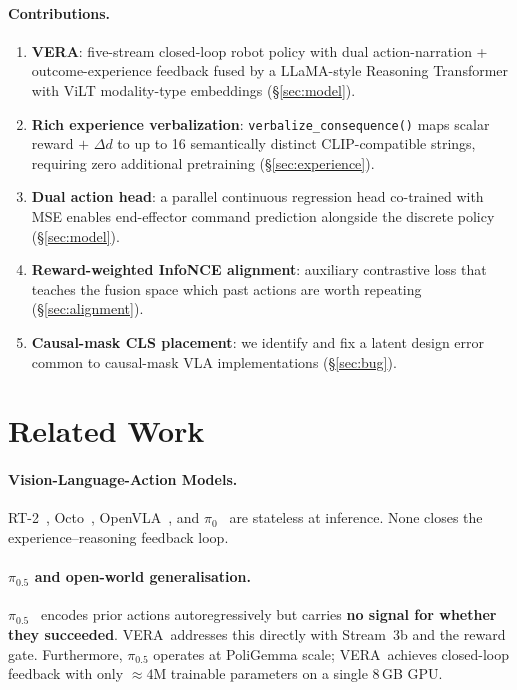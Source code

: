 \documentclass{article}
\newcommand{\modelname}{\textsc{VERA}\xspace}
\begin{document}
\paragraph{Contributions.}
\begin{enumerate}[leftmargin=1.5em,itemsep=2pt]
\item \textbf{\modelname}: five-stream closed-loop robot policy with dual
  action-narration + outcome-experience feedback fused by a LLaMA-style
  Reasoning Transformer with ViLT modality-type embeddings (\S\ref{sec:model}).
\item \textbf{Rich experience verbalization}: \texttt{verbalize\_consequence()}
  maps scalar reward $+$ $\Delta d$ to up to 16 semantically distinct
  CLIP-compatible strings, requiring zero additional pretraining (\S\ref{sec:experience}).
\item \textbf{Dual action head}: a parallel continuous regression head
  co-trained with MSE enables end-effector command prediction alongside the
  discrete policy (\S\ref{sec:model}).
\item \textbf{Reward-weighted InfoNCE alignment}: auxiliary contrastive loss
  that teaches the fusion space which past actions are worth repeating
  (\S\ref{sec:alignment}).
\item \textbf{Causal-mask CLS placement}: we identify and fix a latent
  design error common to causal-mask VLA implementations (\S\ref{sec:bug}).
\end{enumerate}

\section{Related Work}
\label{sec:related}

\paragraph{Vision-Language-Action Models.}
RT-2~\citep{brohan2023rt2}, Octo~\citep{octo2024}, OpenVLA~\citep{kim2024openvla},
and $\pi_0$~\citep{black2024pi0} are stateless at inference.
None closes the experience--reasoning feedback loop.

\paragraph{$\pi_{0.5}$ and open-world generalisation.}
$\pi_{0.5}$~\citep{hejna2025pi05} encodes prior actions autoregressively
but carries \textbf{no signal for whether they succeeded}.
\modelname\ addresses this directly with Stream~3b and the reward gate.
Furthermore, $\pi_{0.5}$ operates at PoliGemma scale;
\modelname\ achieves closed-loop feedback with only ${\approx}4$M
trainable parameters on a single 8\,GB GPU.
\end{document}
